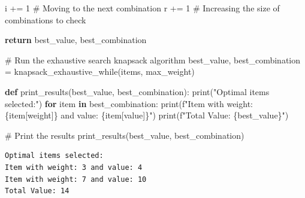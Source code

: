 \documentclass[
  letterpaper,
  DIV=11,
  numbers=noendperiod]{scrreprt}
\newenvironment{Shaded}{\begin{snugshade}}{\end{snugshade}}
\newcommand{\BuiltInTok}[1]{\textcolor[rgb]{0.00,0.23,0.31}{#1}}
\newcommand{\CommentTok}[1]{\textcolor[rgb]{0.37,0.37,0.37}{#1}}
\newcommand{\ControlFlowTok}[1]{\textcolor[rgb]{0.00,0.23,0.31}{\textbf{#1}}}
\newcommand{\DecValTok}[1]{\textcolor[rgb]{0.68,0.00,0.00}{#1}}
\newcommand{\KeywordTok}[1]{\textcolor[rgb]{0.00,0.23,0.31}{\textbf{#1}}}
\newcommand{\NormalTok}[1]{\textcolor[rgb]{0.00,0.23,0.31}{#1}}
\newcommand{\OperatorTok}[1]{\textcolor[rgb]{0.37,0.37,0.37}{#1}}
\newcommand{\SpecialCharTok}[1]{\textcolor[rgb]{0.37,0.37,0.37}{#1}}
\newcommand{\SpecialStringTok}[1]{\textcolor[rgb]{0.13,0.47,0.30}{#1}}
\newcommand{\StringTok}[1]{\textcolor[rgb]{0.13,0.47,0.30}{#1}}
\begin{document}
\begin{Shaded}
\begin{Highlighting}[]
\NormalTok{            i }\OperatorTok{+=} \DecValTok{1}  \CommentTok{\# Moving to the next combination}
\NormalTok{        r }\OperatorTok{+=} \DecValTok{1}  \CommentTok{\# Increasing the size of combinations to check}

    \ControlFlowTok{return}\NormalTok{ best\_value, best\_combination}

\CommentTok{\# Run the exhaustive search knapsack algorithm}
\NormalTok{best\_value, best\_combination }\OperatorTok{=}\NormalTok{ knapsack\_exhaustive\_while(items, max\_weight)}

\KeywordTok{def}\NormalTok{ print\_results(best\_value, best\_combination):}
    \BuiltInTok{print}\NormalTok{(}\StringTok{"Optimal items selected:"}\NormalTok{)}
    \ControlFlowTok{for}\NormalTok{ item }\KeywordTok{in}\NormalTok{ best\_combination:}
        \BuiltInTok{print}\NormalTok{(}\SpecialStringTok{f"Item with weight: }\SpecialCharTok{\{}\NormalTok{item[}\StringTok{\textquotesingle{}weight\textquotesingle{}}\NormalTok{]}\SpecialCharTok{\}}\SpecialStringTok{ and value: }\SpecialCharTok{\{}\NormalTok{item[}\StringTok{\textquotesingle{}value\textquotesingle{}}\NormalTok{]}\SpecialCharTok{\}}\SpecialStringTok{"}\NormalTok{)}
    \BuiltInTok{print}\NormalTok{(}\SpecialStringTok{f"Total Value: }\SpecialCharTok{\{}\NormalTok{best\_value}\SpecialCharTok{\}}\SpecialStringTok{"}\NormalTok{)}
    
\CommentTok{\# Print the results}
\NormalTok{print\_results(best\_value, best\_combination)}
\end{Highlighting}
\end{Shaded}

\begin{verbatim}
Optimal items selected:
Item with weight: 3 and value: 4
Item with weight: 7 and value: 10
Total Value: 14
\end{verbatim}
\end{document}
